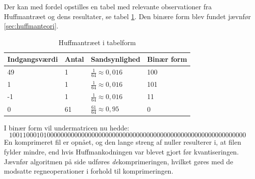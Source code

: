Der kan med fordel opstilles en tabel med relevante observationer fra Huffmantræet og dens resultater, se tabel \ref{tb:Huffman-8x8}. Den binære form blev fundet jævnfør \vref{sec:huffmanteori}.
\begin{table}[!h]
\centering
\begin{tabular}{|l|l|l|l|}
\hline
\textbf{Indgangsværdi} & \textbf{Antal} & \textbf{Sandsynlighed}      & \textbf{Binær form} \\ \hline
49                & 1              & $\frac{1}{64} \approx 0,016$ & 100                 \\ \hline
1                 & 1              & $\frac{1}{64} \approx 0,016$ & 101                 \\ \hline
-1                & 1              & $\frac{1}{64} \approx 0,016$ & 11                  \\ \hline
0                 & 61             & $\frac{61}{64} \approx 0,95$ & 0                   \\ \hline
\end{tabular}
\caption{Huffmantræet i tabelform}
\label{tb:Huffman-8x8}
\end{table}
I binær form vil undermatricen nu hedde: $$ 100110001010000000000000000000000000000000000000000000000000000000000 $$
En komprimeret fil er opnået, og den lange streng af nuller resulterer i, at filen fylder mindre, end hvis Huffmankodningen var blevet gjort før kvantiseringen. Jævnfør algoritmen på side \pageref{tb:Algoritme-Dekomprimering-DCT} udføres \textit{de}komprimeringen, hvilket gøres med de modsatte regneoperationer i forhold til komprimeringen.
